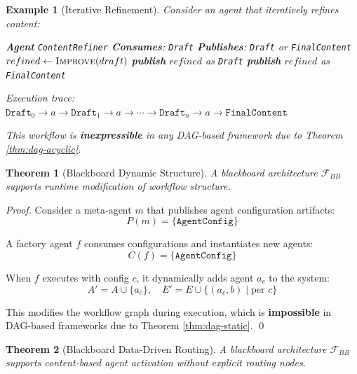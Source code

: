 \documentclass[11pt]{article}
\newtheorem{theorem}{Theorem}
\newtheorem{example}{Example}
\begin{document}
\begin{example}[Iterative Refinement]
\label{ex:refinement}
Consider an agent that iteratively refines content:
\begin{algorithmic}
\State \textbf{Agent} \texttt{ContentRefiner}
\State \textbf{Consumes}: \texttt{Draft}
\State \textbf{Publishes}: \texttt{Draft} or \texttt{FinalContent}
\State
{}
    \State $refined \gets \textsc{Improve}(draft)$
        \State \textbf{publish} $refined$ as \texttt{Draft} 
    \Else
        \State \textbf{publish} $refined$ as \texttt{FinalContent} 
    \EndIf
\EndFunction
\end{algorithmic}

Execution trace: $\texttt{Draft}_0 \rightarrow a \rightarrow \texttt{Draft}_1 \rightarrow a \rightarrow \cdots \rightarrow \texttt{Draft}_n \rightarrow a \rightarrow \texttt{FinalContent}$

This workflow is \textbf{inexpressible} in any DAG-based framework due to Theorem \ref{thm:dag-acyclic}.
\end{example}

\begin{theorem}[Blackboard Dynamic Structure]
\label{thm:bb-dynamic}
A blackboard architecture $\mathcal{F}_{BB}$ supports runtime modification of workflow structure.
\end{theorem}

\begin{proof}
Consider a meta-agent $m$ that publishes agent configuration artifacts:
\[P(m) = \{\texttt{AgentConfig}\}\]

A factory agent $f$ consumes configurations and instantiates new agents:
\[C(f) = \{\texttt{AgentConfig}\}\]

When $f$ executes with config $c$, it dynamically adds agent $a_c$ to the system:
\[A' = A \cup \{a_c\}, \quad E' = E \cup \{(a_c, b) \mid \text{per } c\}\]

This modifies the workflow graph during execution, which is \textbf{impossible} in DAG-based frameworks due to Theorem \ref{thm:dag-static}. \qed
\end{proof}

\begin{theorem}[Blackboard Data-Driven Routing]
\label{thm:bb-routing}
A blackboard architecture $\mathcal{F}_{BB}$ supports content-based agent activation without explicit routing nodes.
\end{theorem}
\end{document}
